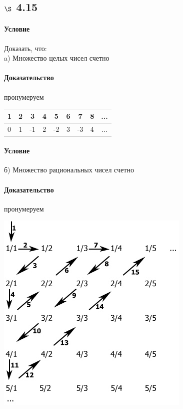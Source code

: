 \documentclass[a4paper,12pt]{article}
\begin{document}
\subsection*{$\S$ 4.15}
\paragraph*{Условие}
Доказать, что:\\
a) Множество целых чисел счетно
\paragraph*{Доказательство}
пронумеруем
\begin{center}
  \begin{tabular}{ | l | c | c| c| c| c| c| c| c }
    \hline
    1 & 2 & 3  & 4 & 5  & 6 & 7  & 8 & ...\\ \hline
    0 & 1 & -1 & 2 & -2 & 3 & -3 & 4 & ...\\ \hline
  \end{tabular}
\end{center}
\paragraph*{Условие}
б) Множество рациональных чисел счетно
\paragraph*{Доказательство}
пронумеруем\\
\begin{center}
  \includegraphics[scale=0.5]{image008.jpg}
\end{center}
\end{document}
